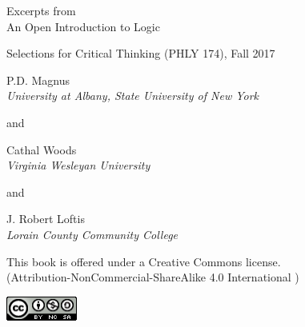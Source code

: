 \setlength{\parindent}{0em}
\thispagestyle{empty}


%


{\large Excerpts from}\\
\vfill
{\LARGE An Open Introduction to Logic}\\
\vfill 




{\large Selections for Critical Thinking (PHLY 174), Fall 2017} 


\vfill

{\sf P.D. Magnus}\\
\emph{University at Albany, State University of New York}

and

{\sf Cathal Woods}\\
\emph{Virginia Wesleyan University}

and

{\sf J. Robert Loftis}\\
\emph{Lorain County Community College}

\vfill

{\sf
	This book is offered under a Creative Commons license.\\
	(Attribution-NonCommercial-ShareAlike 4.0 International )
}

\includegraphics[width=66pt, height=23pt, keepaspectratio=true]{img/cc-by-nc-sa.png}


